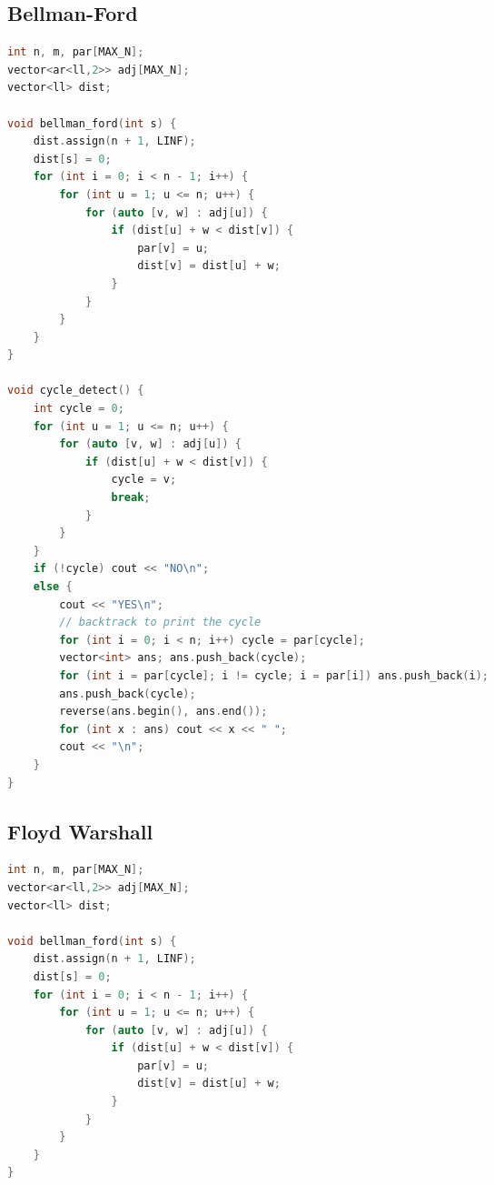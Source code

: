 \documentclass{article}
\begin{document}
\begin{multicols}{2}
\begin{lstlisting}[linewidth=\columnwidth,breaklines=true,language=C++]
\end{lstlisting}
\subsection{Bellman-Ford}
\lstset {    language=C++,
    basicstyle=\small\ttfamily,
    numbers=left,
    breaklines=true,
    tabsize=4}
\begin{lstlisting}[linewidth=\columnwidth,breaklines=true,language=C++]
int n, m, par[MAX_N];
vector<ar<ll,2>> adj[MAX_N];
vector<ll> dist;

void bellman_ford(int s) {
    dist.assign(n + 1, LINF);
    dist[s] = 0;
    for (int i = 0; i < n - 1; i++) {
        for (int u = 1; u <= n; u++) {
            for (auto [v, w] : adj[u]) {
                if (dist[u] + w < dist[v]) {
                    par[v] = u;
                    dist[v] = dist[u] + w;
                }
            }
        }
    }
}

void cycle_detect() {
    int cycle = 0;
    for (int u = 1; u <= n; u++) {
        for (auto [v, w] : adj[u]) {
            if (dist[u] + w < dist[v]) {
                cycle = v; 
                break;
            }
        }
    }
    if (!cycle) cout << "NO\n";
    else {
        cout << "YES\n";
        // backtrack to print the cycle
        for (int i = 0; i < n; i++) cycle = par[cycle];
        vector<int> ans; ans.push_back(cycle);
        for (int i = par[cycle]; i != cycle; i = par[i]) ans.push_back(i); 
        ans.push_back(cycle);
        reverse(ans.begin(), ans.end());
        for (int x : ans) cout << x << " ";
        cout << "\n";
    }
}
\end{lstlisting}
\subsection{Floyd Warshall}
\lstset {    language=C++,
    basicstyle=\small\ttfamily,
    numbers=left,
    breaklines=true,
    tabsize=4}
\begin{lstlisting}[linewidth=\columnwidth,breaklines=true,language=C++]
int n, m, par[MAX_N];
vector<ar<ll,2>> adj[MAX_N];
vector<ll> dist;

void bellman_ford(int s) {
    dist.assign(n + 1, LINF);
    dist[s] = 0;
    for (int i = 0; i < n - 1; i++) {
        for (int u = 1; u <= n; u++) {
            for (auto [v, w] : adj[u]) {
                if (dist[u] + w < dist[v]) {
                    par[v] = u;
                    dist[v] = dist[u] + w;
                }
            }
        }
    }
}


\end{lstlisting}
\end{multicols}
\end{document}
